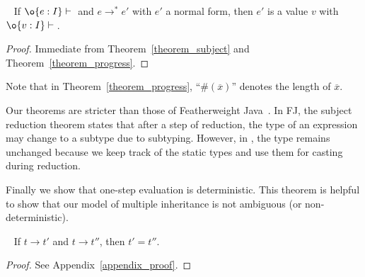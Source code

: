 \begin{theorem}~\label{theorem_soundness}
If $\judgeewf \o {e : I}$ and $e \to^* e'$ with $e'$ a normal form, then $e'$ is 
a value $v$ with $\judgeewf \o {v:I}$.
\end{theorem}
\begin{proof}
Immediate from Theorem~\ref{theorem_subject} and Theorem~\ref{theorem_progress}.
\end{proof}

Note that in Theorem~\ref{theorem_progress}, ``$\#(\overline{x})$'' denotes the length of
$\overline{x}$.

Our theorems are stricter than those of Featherweight Java~\cite{Igarashi01FJ}. In FJ, the subject reduction theorem states that 
after a step of reduction, the type of an expression may change to a subtype due to subtyping. However, in \MIM{}, 
the type remains unchanged because we keep track of the static types and use them for casting during
reduction. 

Finally we show that one-step evaluation is deterministic. This
theorem is helpful to show that our model of multiple inheritance is
not ambiguous (or non-deterministic).

\begin{theorem}~\label{theorem_determinacy}
	If $t \to t'$ and $t \to t''$, then $t' = t''$.
\end{theorem}
\begin{proof}
See Appendix~\ref{appendix_proof}.
\end{proof}

